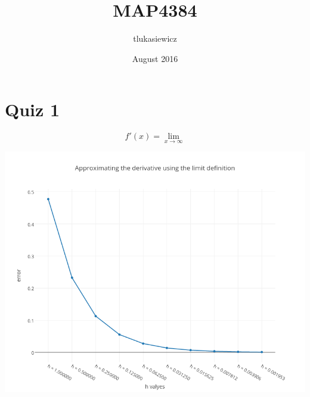 \documentclass{article}
\title{MAP4384}
\author{tlukasiewicz }
\date{August 2016}
\begin{document}
\maketitle

\section{Quiz 1}
\begin{equation}
    f'(x) = \lim _ {x \to \infty }
\end{equation}

\includegraphics[scale = .5]{graph}
\end{document}

